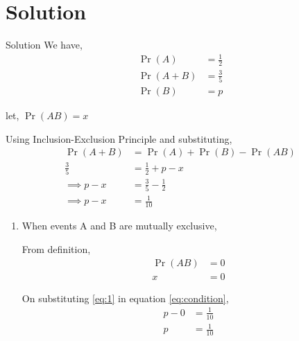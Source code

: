 \documentclass{beamer}
\providecommand{\pr}[1]{\ensuremath{\Pr\left(#1\right)}}
\newcounter{saveenumi}
\newcommand{\seti}{\setcounter{saveenumi}{\value{enumi}}}
\begin{document}
\section{Solution}	
	\begin{frame}{Solution}
		We have,
		      \begin{align}
                     \pr{A} &= \frac{1}{2} \\
                 \pr{A + B} &= \frac{3}{5} \\
                     \pr{B} &= p
              \end{align}
		  
		let, $\pr{AB} = x$
		      
	    Using Inclusion-Exclusion Principle and substituting,
	          \begin{align}
                    \pr{A + B} &= \pr{A} + \pr{B} - \pr{AB} \\
                   \frac{3}{5} &= \frac{1}{2} + p - x \\
                \implies p - x &= \frac{3}{5} - \frac{1}{2} \\
                     \label{eq:condition}
                \implies p - x &= \frac{1}{10}
              \end{align}
              
	\end{frame}

    \begin{frame}     
        \begin{enumerate}
           \item When events A and B are mutually exclusive,
           
             From definition,
               \begin{align}
                  \pr{AB} &= 0 \\
                     \label{eq:1}
                        x &= 0
               \end{align}
               
            On substituting \eqref{eq:1} in equation \eqref{eq:condition},
              \begin{align}
                   p - 0 &= \frac{1}{10} \\ 
                       p &= \frac{1}{10}         
              \end{align}
        \seti            
        \end{enumerate}
                              
    \end{frame} 
    
\end{document}
